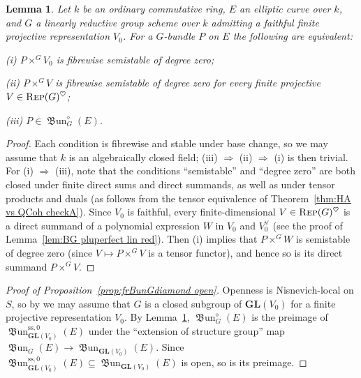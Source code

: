 \documentclass[12pt, oneside]{amsart}
\numberwithin{equation}{section}
\newtheorem{lemma}[subsubsection]{Lemma}
\theoremstyle{remark}
\theoremstyle{plain}
\newcommand{\Rep}{\textsc{Rep}}
\newcommand{\GL}{\mathbf{GL}}
\renewcommand{\ss}{\mathrm{ss}}
\newcommand{\frBun}{\operatorname{\mathfrak{B}un}}
\begin{document}
\begin{lemma}\label{lem:diamond one rep}
  Let $k$ be an ordinary commutative ring, $E$ an elliptic curve over $k$, and $G$ a linearly reductive group scheme over $k$ admitting a faithful finite projective representation $V_0$.
  For a $G$-bundle $P$ on $E$ the following are equivalent:

  (i) $P \times^G V_0$ is fibrewise semistable of degree zero;

  (ii) $P \times^G V$ is fibrewise semistable of degree zero for every finite projective $V \in \Rep(G)^\heartsuit$;

  (iii) $P \in \frBun_G^\diamond(E)$.
\end{lemma}
\begin{proof}
  Each condition is fibrewise and stable under base change, so we may assume that $k$ is an algebraically closed field; (iii) $\Rightarrow$ (ii) $\Rightarrow$ (i) is then trivial.
  For (i) $\Rightarrow$ (iii), note that the conditions ``semistable'' and ``degree zero'' are both closed under finite direct sums and direct summands, as well as under tensor products and duals (as follows from the tensor equivalence of Theorem~\ref{thm:HA vs QCoh checkA}).
  Since $V_0$ is faithful, every finite-dimensional $V \in \Rep(G)^\heartsuit$ is a direct summand of a polynomial expression $W$ in $V_0$ and $V_0^\vee$ (see the proof of Lemma~\ref{lem:BG pluperfect lin red}).
  Then (i) implies that $P \times^G W$ is semistable of degree zero (since $V \mapsto P \times^G V$ is a tensor functor), and hence so is its direct summand $P \times^G V$.
\end{proof}

\begin{proof}[Proof of Proposition~\ref{prop:frBunGdiamond open}]
  Openness is Nisnevich-local on $S$, so by \cite[Cor.~6.2(2)]{AHRLocalStructure} we may assume that $G$ is a closed subgroup of $\GL(V_0)$ for a finite projective representation $V_0$.
  By Lemma~\ref{lem:diamond one rep}, $\frBun_G^\diamond(E)$ is the preimage of $\frBun_{\GL(V_0)}^{\ss,0}(E)$ under the ``extension of structure group'' map $\frBun_G(E) \to \frBun_{\GL(V_0)}(E)$.
  Since $\frBun_{\GL(V_0)}^{\ss,0}(E) \subseteq \frBun_{\GL(V_0)}(E)$ is open, so is its preimage.
\end{proof}

\subsubsection{}\label{sssec:BunG decomposition}
\end{document}
